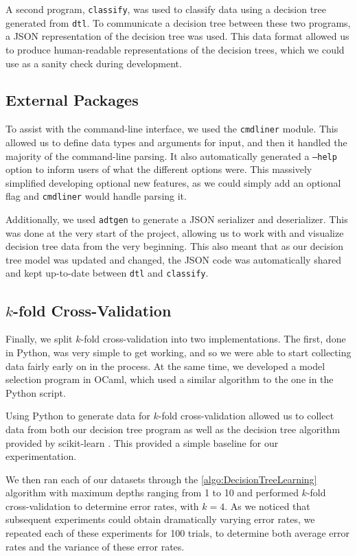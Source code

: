 \documentclass[screen, authorversion, nonacm, sigconf]{acmart}
\begin{document}
A second program, \texttt{classify}, was used to classify data using a decision tree generated from \texttt{dtl}. To communicate a decision tree between these two programs, a JSON representation of the decision tree was used. This data format allowed us to produce human-readable representations of the decision trees, which we could use as a sanity check during development.

\subsection{External Packages}

To assist with the command-line interface, we used the \texttt{cmdliner} module. This allowed us to define data types and arguments for input, and then it handled the majority of the command-line parsing. It also automatically generated a \texttt{--help} option to inform users of what the different options were. This massively simplified developing optional new features, as we could simply add an optional flag and \texttt{cmdliner} would handle parsing it.

Additionally, we used \texttt{adtgen} to generate a JSON serializer and deserializer. This was done at the very start of the project, allowing us to work with and visualize decision tree data from the very beginning. This also meant that as our decision tree model was updated and changed, the JSON code was automatically shared and kept up-to-date between \texttt{dtl} and \texttt{classify}.

\subsection{$k$-fold Cross-Validation}

Finally, we split $k$-fold cross-validation into two implementations. The first, done in Python, was very simple to get working, and so we were able to start collecting data fairly early on in the process. At the same time, we developed a model selection program in OCaml, which used a similar algorithm to the one in the Python script.

Using Python to generate data for $k$-fold cross-validation allowed us to collect data from both our decision tree program as well as the decision tree algorithm provided by scikit-learn \cite{scikit-learn}. This provided a simple baseline for our experimentation.

We then ran each of our datasets through the \ref{algo:DecisionTreeLearning} algorithm with maximum depths ranging from 1 to 10 and performed $k$-fold cross-validation to determine error rates, with $k = 4$. As we noticed that subsequent experiments could obtain dramatically varying error rates, we repeated each of these experiments for 100 trials, to determine both average error rates and the variance of these error rates.
\end{document}
